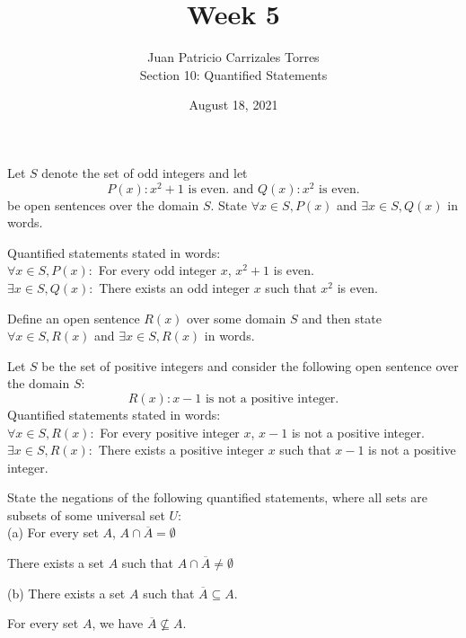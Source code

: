 \documentclass[12pt]{article}
\newenvironment{problem}[2][Problem]{\begin{trivlist}
		\item[\hskip \labelsep {\bfseries #1}\hskip \labelsep {\bfseries #2.}]}{\end{trivlist}}
\newenvironment{solution}[2][Solution]{\begin{trivlist}
		\item[\hskip \labelsep {\bfseries #1}\hskip \labelsep {\bfseries #2.}]}{\end{trivlist}}
\begin{document}
	
	\title{Week 5}
	\author{Juan Patricio Carrizales Torres \\
		Section 10: Quantified Statements}
	\date{August 18, 2021}
	\maketitle

\begin{problem}{65}
	Let $S$ denote the set of odd integers and let
	\begin{equation*}
		P(x): x^{2}+1 \text{ is even.  and  } Q(x):x^{2} \text{ is even.}
	\end{equation*}
	be open sentences over the domain $S$. State $\forall x \in S,P(x)$ and $\exists x \in S,Q(x)$ in words.
	
	\begin{solution}{}
		Quantified statements stated in words:\\
		$\forall x \in S, P(x):$ For every odd integer $x$, $x^{2} + 1$ is even.\\
		$\exists x \in S,Q(x):$ There exists an odd integer $x$ such that $x^{2}$ is even.
		\end{solution}
\end{problem}

\begin{problem}{66}
	Define an open sentence $R(x)$ over some domain $S$ and then state $\forall x \in S,R(x)$ and $\exists x \in S, R(x)$ in words.
	\begin{solution}{}
		Let $S$ be the set of positive integers and consider the following open sentence over the domain $S$:
		\begin{equation*}
			R(x): x - 1 \text{ is not a positive integer.}
		\end{equation*}
	Quantified statements stated in words:\\
	$\forall x \in S, R(x):$ For every positive integer $x$, $x-1$ is not a positive integer.\\
	$\exists x \in S, R(x):$ There exists a positive integer $x$ such that $x-1$ is not a positive integer.
	\end{solution}
\end{problem}

\begin{problem}{67}
	State the negations of the following quantified statements, where all sets are subsets of some universal set $U$:\\
	(a) For every set $A$, $A\cap \overline{A} = \emptyset$
	 \begin{solution}{a}
	 	There exists a set $A$ such that $A \cap \overline{A} \neq \emptyset$ 
	 \end{solution}
 	(b) There exists a set $A$ such that $\overline{A} \subseteq A$.
 	\begin{solution}{b}
 		For every set $A$, we have $\overline{A} \nsubseteq A$.
 	\end{solution}
\end{problem}
\end{document}
